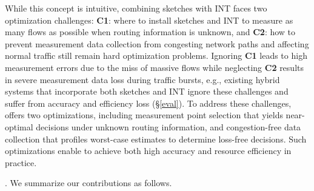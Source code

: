 While this concept is intuitive, combining sketches with INT faces two optimization challenges: \textbf{C1}: where to install sketches and INT to measure as many flows as possible when routing information is unknown, and \textbf{C2}: how to prevent measurement data collection from congesting network paths and affecting normal traffic still remain hard optimization problems. Ignoring \textbf{C1} leads to high measurement errors due to the miss of massive flows while neglecting \textbf{C2} results in severe measurement data loss during traffic bursts, e.g., existing hybrid systems \cite{yang2023sketchint,zhao2021lightguardian} that incorporate both sketches and INT ignore these challenges and suffer from accuracy and efficiency loss (\S\ref{eval}). To address these challenges, \sysname offers two optimizations, including measurement point selection that yields near-optimal decisions under unknown routing information, and congestion-free data collection that profiles worst-case estimates to determine loss-free decisions. Such optimizations enable \sysname to achieve both high accuracy and resource efficiency in practice. 



. 
We summarize our contributions as follows.  


